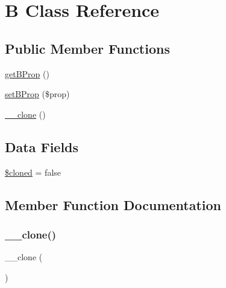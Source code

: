 \hypertarget{class_deep_copy_1_1f006_1_1_b}{}\section{B Class Reference}
\label{class_deep_copy_1_1f006_1_1_b}
\subsection*{Public Member Functions}
\begin{DoxyCompactItemize}
\item 
\mbox{\hyperlink{class_deep_copy_1_1f006_1_1_b_ad34da7480b0331b1fc8dca0163376f59}{get\+B\+Prop}} ()
\item 
\mbox{\hyperlink{class_deep_copy_1_1f006_1_1_b_adeb42026a8c9c022200c5c7b7e2bba06}{set\+B\+Prop}} (\$prop)
\item 
\mbox{\hyperlink{class_deep_copy_1_1f006_1_1_b_ad0cb87b388bc74d63dc884accdca8713}{\+\_\+\+\_\+clone}} ()
\end{DoxyCompactItemize}
\subsection*{Data Fields}
\begin{DoxyCompactItemize}
\item 
\mbox{\hyperlink{class_deep_copy_1_1f006_1_1_b_adde823dfad7d62fbfb51f60b16dcb8d6}{\$cloned}} = false
\end{DoxyCompactItemize}


\subsection{Member Function Documentation}
\mbox{\label{class_deep_copy_1_1f006_1_1_b_ad0cb87b388bc74d63dc884accdca8713}} 
\subsubsection{\texorpdfstring{\+\_\+\+\_\+clone()}{\_\_clone()}}
{\footnotesize\ttfamily \+\_\+\+\_\+clone (\begin{DoxyParamCaption}{ }\end{DoxyParamCaption})}

\mbox{\label{class_deep_copy_1_1f006_1_1_b_ad34da7480b0331b1fc8dca0163376f59}} 
